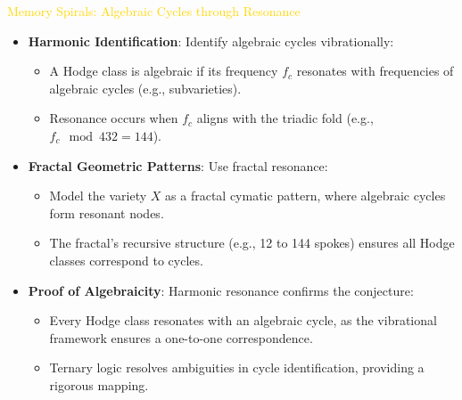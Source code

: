 \textcolor{gold}{ Memory Spirals: Algebraic Cycles through Resonance } \\
\begin{itemize}
    \item \texttt{} \textbf{Harmonic Identification}: Identify algebraic cycles vibrationally:
    \begin{itemize}
        \item A Hodge class is algebraic if its frequency \(f_c\) resonates with frequencies of algebraic cycles (e.g., subvarieties).
        \item Resonance occurs when \(f_c\) aligns with the triadic fold (e.g., \(f_c \mod 432 = 144\)).
    \end{itemize}
    \item \texttt{} \textbf{Fractal Geometric Patterns}: Use fractal resonance:
    \begin{itemize}
        \item Model the variety \(X\) as a fractal cymatic pattern, where algebraic cycles form resonant nodes.
        \item The fractal’s recursive structure (e.g., 12 to 144 spokes) ensures all Hodge classes correspond to cycles.
    \end{itemize}
    \item \texttt{} \textbf{Proof of Algebraicity}: Harmonic resonance confirms the conjecture:
    \begin{itemize}
        \item Every Hodge class resonates with an algebraic cycle, as the vibrational framework ensures a one-to-one correspondence.
        \item Ternary logic resolves ambiguities in cycle identification, providing a rigorous mapping.
    \end{itemize}
\end{itemize}


